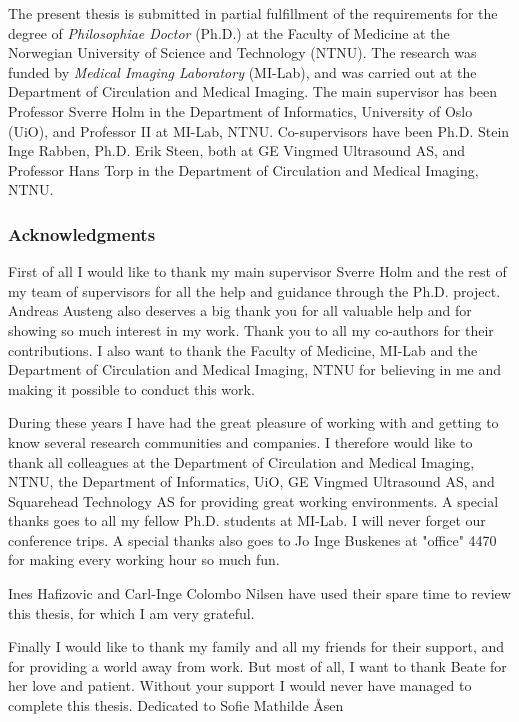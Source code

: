 \documentclass[10pt,b5paper,twoside]{book}
\begin{document}


%
The present thesis is submitted in partial fulfillment of the requirements for the degree of \textit{Philosophiae Doctor} (Ph.D.) at the Faculty of Medicine at the Norwegian University of Science and Technology (NTNU). The research was funded by \textit{Medical Imaging Laboratory} (MI-Lab), and was carried out at the Department of Circulation and Medical Imaging. The main supervisor has been Professor Sverre Holm in the Department of Informatics, University of Oslo (UiO), and Professor II at MI-Lab, NTNU. Co-supervisors have been Ph.D. Stein Inge Rabben, Ph.D. Erik Steen, both at GE Vingmed Ultrasound AS, and Professor Hans Torp in the Department of Circulation and Medical Imaging, NTNU.


\subsubsection{Acknowledgments}
First of all I would like to thank my main supervisor Sverre Holm and the rest of my team of supervisors for all the help and guidance through the Ph.D. project. Andreas Austeng also deserves a big thank you for all valuable help and for showing so much interest in my work. Thank you to all my co-authors for their contributions. I also want to thank the Faculty of Medicine, MI-Lab and the Department of Circulation and Medical Imaging, NTNU for believing in me and making it possible to conduct this work.

During these years I have had the great pleasure of working with and getting to know several research communities and companies. I therefore would like to thank all colleagues at the Department of Circulation and Medical Imaging, NTNU, the Department of Informatics, UiO, GE Vingmed Ultrasound AS, and Squarehead Technology AS for providing great working environments. A special thanks goes to all my fellow Ph.D. students at MI-Lab. I will never forget our conference trips. A special thanks also goes to Jo Inge Buskenes at "office" 4470 for making every working hour so much fun.

Ines Hafizovic and Carl-Inge Colombo Nilsen have used their spare time to review this thesis, for which I am very grateful.  

Finally I would like to thank my family and all my friends for their support, and for providing a world away from work. But most of all, I want to thank Beate for her love and patient. Without your support I would never have managed to complete this thesis.
\null
\vfill
\hfill Dedicated to Sofie Mathilde \AA{}sen
\end{document}

